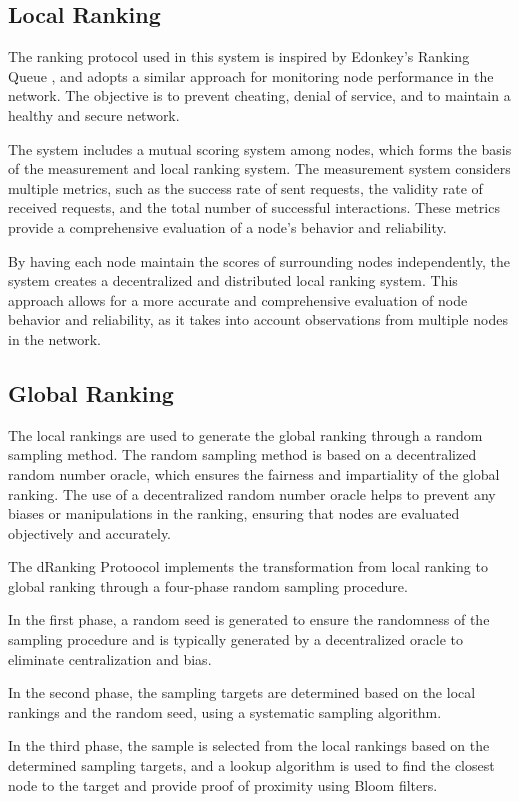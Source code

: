 \documentclass[twocolumn]{article}
\begin{document}
\subsection{Local Ranking}
The ranking protocol used in this system is inspired by Edonkey's Ranking Queue \cite{Edonkey}, and adopts a similar approach for monitoring node performance in the network. The objective is to prevent cheating, denial of service, and to maintain a healthy and secure network.

The system includes a mutual scoring system among nodes, which forms the basis of the measurement and local ranking system. The measurement system considers multiple metrics, such as the success rate of sent requests, the validity rate of received requests, and the total number of successful interactions. These metrics provide a comprehensive evaluation of a node's behavior and reliability.

By having each node maintain the scores of surrounding nodes independently, the system creates a decentralized and distributed local ranking system. This approach allows for a more accurate and comprehensive evaluation of node behavior and reliability, as it takes into account observations from multiple nodes in the network.

\subsection{Global Ranking}
The local rankings are used to generate the global ranking through a random sampling method. The random sampling method is based on a decentralized random number oracle, which ensures the fairness and impartiality of the global ranking. The use of a decentralized random number oracle helps to prevent any biases or manipulations in the ranking, ensuring that nodes are evaluated objectively and accurately.

The dRanking Protoocol implements the transformation from local ranking to global ranking through a four-phase random sampling procedure.

In the first phase, a random seed is generated to ensure the randomness of the sampling procedure and is typically generated by a decentralized oracle to eliminate centralization and bias.

In the second phase, the sampling targets are determined based on the local rankings and the random seed, using a systematic sampling algorithm.

In the third phase, the sample is selected from the local rankings based on the determined sampling targets, and a lookup algorithm is used to find the closest node to the target and provide proof of proximity using Bloom filters.
\end{document}
